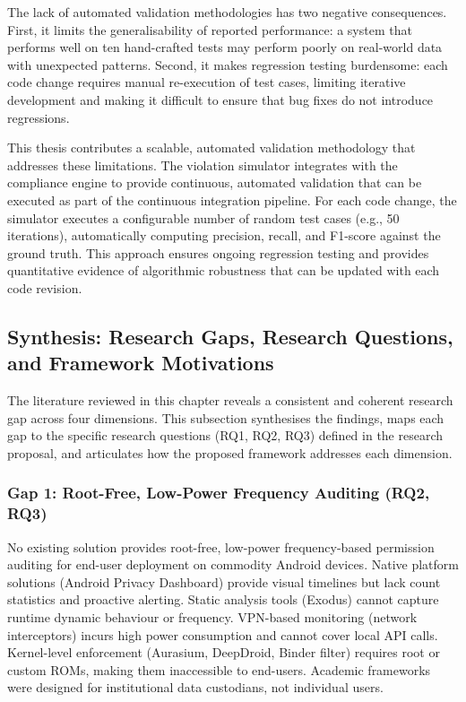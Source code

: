 The lack of automated validation methodologies has two negative consequences. First, it limits the generalisability of reported performance: a system that performs well on ten hand-crafted tests may perform poorly on real-world data with unexpected patterns. Second, it makes regression testing burdensome: each code change requires manual re-execution of test cases, limiting iterative development and making it difficult to ensure that bug fixes do not introduce regressions.

This thesis contributes a scalable, automated validation methodology that addresses these limitations. The violation simulator integrates with the compliance engine to provide continuous, automated validation that can be executed as part of the continuous integration pipeline. For each code change, the simulator executes a configurable number of random test cases (e.g., 50 iterations), automatically computing precision, recall, and F1-score against the ground truth. This approach ensures ongoing regression testing and provides quantitative evidence of algorithmic robustness that can be updated with each code revision.

\subsection{Synthesis: Research Gaps, Research Questions, and Framework Motivations}
The literature reviewed in this chapter reveals a consistent and coherent research gap across four dimensions. This subsection synthesises the findings, maps each gap to the specific research questions (RQ1, RQ2, RQ3) defined in the research proposal, and articulates how the proposed framework addresses each dimension.

\subsubsection{Gap 1: Root-Free, Low-Power Frequency Auditing (RQ2, RQ3)}
No existing solution provides root-free, low-power frequency-based permission auditing for end-user deployment on commodity Android devices. Native platform solutions (Android Privacy Dashboard) provide visual timelines but lack count statistics and proactive alerting. Static analysis tools (Exodus) cannot capture runtime dynamic behaviour or frequency. VPN-based monitoring (network interceptors) incurs high power consumption and cannot cover local API calls. Kernel-level enforcement (Aurasium, DeepDroid, Binder filter) requires root or custom ROMs, making them inaccessible to end-users. Academic frameworks were designed for institutional data custodians, not individual users.

